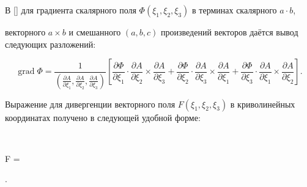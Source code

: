  

В []  для градиента скалярного поля  $\Phi(\xi_1,\xi_2,\xi_3)$ в терминах скалярного $a\cdot b$, 

векторного $a\times b$ и смешанного $(a,b,c)$ произведений векторов даётся вывод следующих разложений: 

$$

\mathop{\mathrm{grad}} \Phi  {=} \frac{1}{\left (\frac{\partial A}{\partial\xi_1},

\frac{\partial A}{\partial\xi_2},\frac{\partial A}{\partial\xi_3}\right )}

{\left [

\frac{\partial\Phi}{\partial\xi_1}\cdot

\frac{\partial A}{\partial\xi_2}\times

\frac{\partial A}{\partial\xi_3} +

\frac{\partial\Phi}{\partial\xi_2}\cdot

\frac{\partial A}{\partial\xi_3}\times

\frac{\partial A}{\partial\xi_1} +

\frac{\partial\Phi}{\partial\xi_3}\cdot

\frac{\partial A}{\partial\xi_1}\times

\frac{\partial A}{\partial\xi_2}

\right ]}.

$$

 Выражение для дивергенции векторного поля $F(\xi_1,\xi_2,\xi_3)$ в криволинейных координатах получено в следующей удобной форме: 

$$

 F  = 

{}.

